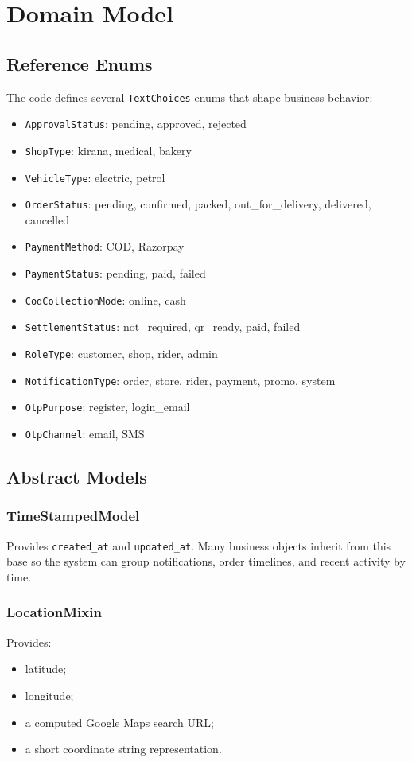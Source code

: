 \documentclass[12pt,a4paper]{article}
\begin{document}
\section{Domain Model}
\subsection{Reference Enums}
The code defines several \texttt{TextChoices} enums that shape business behavior:
\begin{itemize}[leftmargin=1.5em]
    \item \texttt{ApprovalStatus}: pending, approved, rejected
    \item \texttt{ShopType}: kirana, medical, bakery
    \item \texttt{VehicleType}: electric, petrol
    \item \texttt{OrderStatus}: pending, confirmed, packed, out\_for\_delivery, delivered, cancelled
    \item \texttt{PaymentMethod}: COD, Razorpay
    \item \texttt{PaymentStatus}: pending, paid, failed
    \item \texttt{CodCollectionMode}: online, cash
    \item \texttt{SettlementStatus}: not\_required, qr\_ready, paid, failed
    \item \texttt{RoleType}: customer, shop, rider, admin
    \item \texttt{NotificationType}: order, store, rider, payment, promo, system
    \item \texttt{OtpPurpose}: register, login\_email
    \item \texttt{OtpChannel}: email, SMS
\end{itemize}

\subsection{Abstract Models}
\subsubsection{TimeStampedModel}
Provides \texttt{created\_at} and \texttt{updated\_at}. Many business objects inherit from this base so the system can group notifications, order timelines, and recent activity by time.

\subsubsection{LocationMixin}
Provides:
\begin{itemize}[leftmargin=1.5em]
    \item latitude;
    \item longitude;
    \item a computed Google Maps search URL;
    \item a short coordinate string representation.
\end{itemize}
\end{document}
